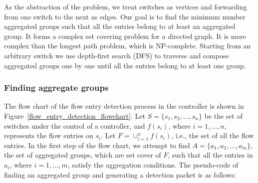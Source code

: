 \documentclass[conference]{IEEEtran}
\begin{document}
As the abstraction of the problem, we treat switches as vertices and forwarding from one switch to the next as edges. Our goal is to find the minimum number aggregated groups such that all the entries belong to at least an aggregated group. It forms a complex set covering problem for a directed graph. It is more complex than the longest path problem, which is NP-complete. Starting from an arbitrary switch we use depth-first search (DFS) to traverse and compose aggregated groups one by one until all the entries belong to at least one group. 

\subsubsection{Finding aggregate groups}
\label{Aggregated_group_finding}

The flow chart of the flow entry detection process in the controller is shown in Figure~\ref{flow_entry_detection_flowchart}. Let $S=\{s_1,s_2,\ldots,s_n\}$ be the set of switches under the control of a controller, and $f(s_i)$, where $i=1,\ldots,n$, represents the flow entries on $s_i$. Let $F=\cup_{i=1}^n f(s_i)$, i.e., the set of all the flow entries. In the first step of the flow chart, we attempt to find $A=\{a_1, a_2, \ldots, a_m\}$, the set of aggregated groups, which are set cover of $F$, such that all the entries in $a_i$, where $i=1,\ldots,m$, satisfy the aggregation conditions. The pseudo-code of finding an aggregated group and generating a detection packet is as follows:
\end{document}
